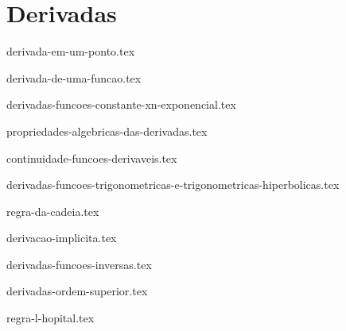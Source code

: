 \part{Derivadas}

{derivada-em-um-ponto.tex}

{derivada-de-uma-funcao.tex}

{derivadas-funcoes-constante-xn-exponencial.tex}

{propriedades-algebricas-das-derivadas.tex}

{continuidade-funcoes-derivaveis.tex}

{derivadas-funcoes-trigonometricas-e-trigonometricas-hiperbolicas.tex}

{regra-da-cadeia.tex}

{derivacao-implicita.tex}

{derivadas-funcoes-inversas.tex}

{derivadas-ordem-superior.tex}

{regra-l-hopital.tex}
